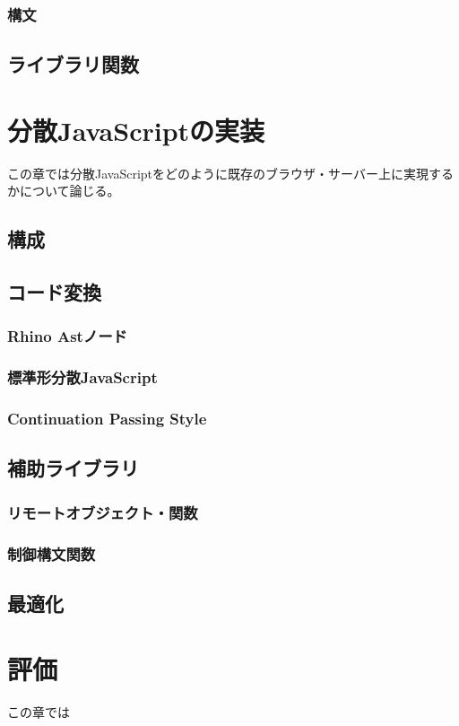 \documentclass[a4j,12pt]{jreport}
\begin{document}
\subsection{構文}
\section{ライブラリ関数}

\chapter{分散JavaScriptの実装}
この章では分散JavaScriptをどのように既存のブラウザ・サーバー上に実現するかについて論じる。
\section{構成}
\section{コード変換}
\subsection{Rhino Astノード}
\subsection{標準形分散JavaScript}
\subsection{Continuation Passing Style}
\section{補助ライブラリ}
\subsection{リモートオブジェクト・関数}
\subsection{制御構文関数}
\section{最適化}

\chapter{評価}
この章では
\end{document}
